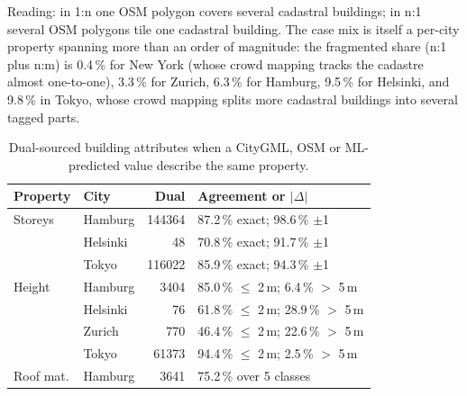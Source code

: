 \documentclass[sigconf,authordraft]{acmart}
\begin{document}
\begin{table}[h!]
  \smallskip\raggedright\footnotesize
  Reading: in 1:n one OSM polygon covers several cadastral buildings; in n:1 several OSM polygons tile one cadastral building. The case mix is itself a per-city property spanning more than an order of magnitude: the fragmented share (n:1 plus n:m) is 0.4\,\% for New York (whose crowd mapping tracks the cadastre almost one-to-one), 3.3\,\% for Zurich, 6.3\,\% for Hamburg, 9.5\,\% for Helsinki, and 9.8\,\% in Tokyo, whose crowd mapping splits more cadastral buildings into several tagged parts.
\end{table}

\begin{table}[h!]
  \caption{
  Dual-sourced building attributes when a CityGML, OSM or ML-predicted value describe the same property. 
  }
  \label{tab:dual_attrs}
  \begin{tabularx}{\linewidth}{llrX}
    \toprule
    Property & City & Dual & Agreement or $|\Delta|$\\
    \midrule
    Storeys & Hamburg & \num{144364} & 87.2\,\% exact; 98.6\,\% $\pm$1 \\
    & Helsinki & \num{48} & 70.8\,\% exact; 91.7\,\% $\pm$1 \\
    & Tokyo & \num{116022} & 85.9\,\% exact; 94.3\,\% $\pm$1 \\
    \addlinespace
    Height & Hamburg & \num{3404} & 85.0\,\% $\leq$ 2\,m; 6.4\,\% $>$ 5\,m \\
    & Helsinki & \num{76} & 61.8\,\% $\leq$ 2\,m; 28.9\,\% $>$ 5\,m \\
    & Zurich & \num{770} & 46.4\,\% $\leq$ 2\,m; 22.6\,\% $>$ 5\,m \\
    & Tokyo & \num{61373} & 94.4\,\% $\leq$ 2\,m; 2.5\,\% $>$ 5\,m \\
    \addlinespace
    Roof mat. & Hamburg & \num{3641} & 75.2\,\% over 5 classes \\
    \bottomrule
  \end{tabularx}
\end{table}
\end{document}
